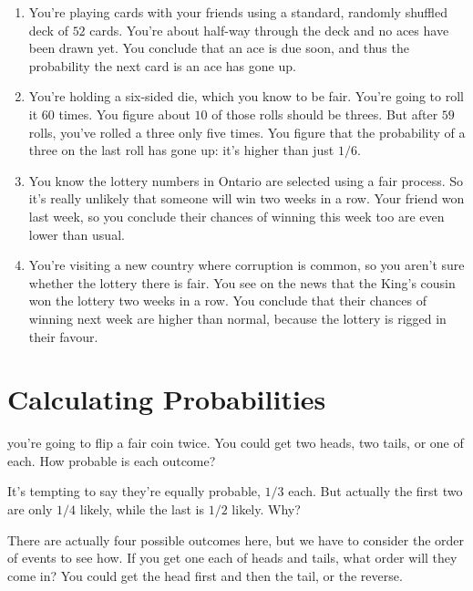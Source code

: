 \documentclass[justified]{tufte-book}
\theoremstyle{definition}
\theoremstyle{definition}
\theoremstyle{definition}
\theoremstyle{remark}
\begin{document}
\begin{enumerate}
  \begin{enumerate}
  \def\labelenumii{\alph{enumii}.}
  \item
    You're playing cards with your friends using a standard, randomly
    shuffled deck of \(52\) cards. You're about half-way through the
    deck and no aces have been drawn yet. You conclude that an ace is
    due soon, and thus the probability the next card is an ace has gone
    up.
  \item
    You're holding a six-sided die, which you know to be fair. You're
    going to roll it \(60\) times. You figure about \(10\) of those
    rolls should be threes. But after \(59\) rolls, you've rolled a
    three only five times. You figure that the probability of a three on
    the last roll has gone up: it's higher than just \(1/6\).
  \item
    You know the lottery numbers in Ontario are selected using a fair
    process. So it's really unlikely that someone will win two weeks in
    a row. Your friend won last week, so you conclude their chances of
    winning this week too are even lower than usual.
  \item
    You're visiting a new country where corruption is common, so you
    aren't sure whether the lottery there is fair. You see on the news
    that the King's cousin won the lottery two weeks in a row. You
    conclude that their chances of winning next week are higher than
    normal, because the lottery is rigged in their favour.
  \end{enumerate}
\end{enumerate}

\hypertarget{calculating-probabilities}{%
\chapter{Calculating Probabilities}\label{calculating-probabilities}}

 you're going to flip a fair coin twice. You could
get two heads, two tails, or one of each. How probable is each outcome?

It's tempting to say they're equally probable, \(1/3\) each. But
actually the first two are only \(1/4\) likely, while the last is
\(1/2\) likely. Why?

There are actually four possible outcomes here, but we have to consider
the order of events to see how. If you get one each of heads and tails,
what order will they come in? You could get the head first and then the
tail, or the reverse.
\end{document}
